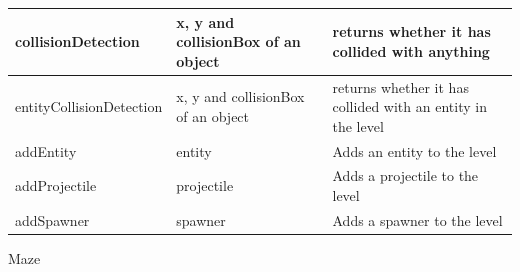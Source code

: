 \documentclass{article}
\begin{document}
\begin{center}
\begin{tabular}{ | m{} | m{}| m{} | }
                        \hline
                        collisionDetection & x, y and collisionBox of an object & returns whether it has collided with anything \\
                        \hline
                        entityCollisionDetection & x, y and collisionBox of an object & returns whether it has collided with an entity in the level \\
                        \hline
                        addEntity & entity & Adds an entity to the level \\
                        \hline
                        addProjectile & projectile & Adds a projectile to the level \\
                        \hline
                        addSpawner & spawner & Adds a spawner to the level \\
                        \hline
                    \end{tabular}
                \end{center}
                Maze
\end{document}
